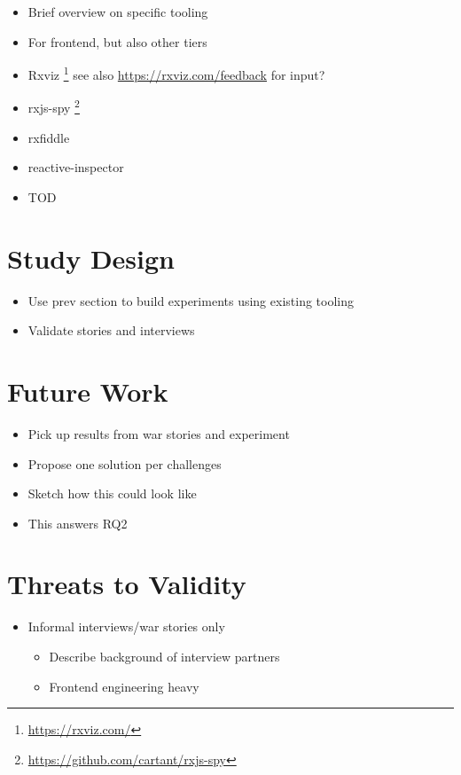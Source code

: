 \documentclass[12pt,a4paper]{article}
\begin{document}
\begin{itemize}
	\item Brief overview on specific tooling
	\item For frontend, but also other tiers
	\item Rxviz \footnote{\url{https://rxviz.com/}} see also \url{https://rxviz.com/feedback} for input?
	\item rxjs-spy \footnote{\url{https://github.com/cartant/rxjs-spy}}
	\item rxfiddle \cite{10.1145/3180155.3180156}
	\item reactive-inspector \cite{10.1145/2884781.2884815}
	\item TOD \cite{5287015}
\end{itemize}


\section{Study Design}
\label{sec:study}

\begin{itemize}
	\item Use prev section to build experiments using existing tooling
	\item Validate stories and interviews
\end{itemize}

\section{Future Work}
\label{sec:future}

\begin{itemize}
	\item Pick up results from war stories and experiment
	\item Propose one solution per challenges
	\item Sketch how this could look like
	\item This answers RQ2
\end{itemize}

\section{Threats to Validity}
\label{sec:threats}

\begin{itemize}
	\item Informal interviews/war stories only
	\begin{itemize}
		\item Describe background of interview partners
		\item Frontend engineering heavy
	\end{itemize}
\end{itemize}
\end{document}
